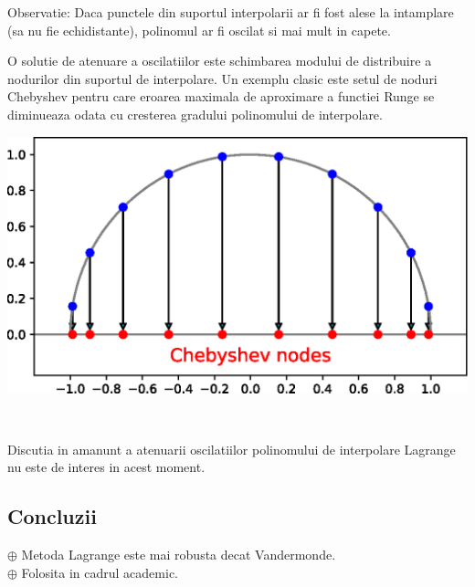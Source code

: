 \documentclass{article}
\begin{document}
Observatie: Daca punctele din suportul interpolarii ar fi fost alese la intamplare (sa nu fie echidistante), polinomul ar fi oscilat si mai mult in capete.\\

\noindent\begin{minipage}{0.45\textwidth}
    \tabto{0.5cm} O solutie de atenuare a oscilatiilor este schimbarea modului de distribuire a nodurilor din suportul de interpolare. Un exemplu clasic este setul de noduri Chebyshev \framebox[0.3cm][r]{\footnotemark} pentru care eroarea maximala de aproximare a functiei Runge se diminueaza odata cu cresterea gradului polinomului de interpolare.
\end{minipage}
\hfill
\begin{minipage}{0.5\textwidth}
    \includegraphics[scale=0.5]{chebyshev_nodes}
\end{minipage}\\


Discutia in amanunt a atenuarii oscilatiilor polinomului de interpolare Lagrange nu este de interes in acest moment.\framebox[0.3cm][r]{\footnotemark}



\subsection{Concluzii}
\tab
$\oplus$ Metoda Lagrange este mai robusta decat Vandermonde.\\

$\oplus$ Folosita in cadrul academic.\\
\end{document}
